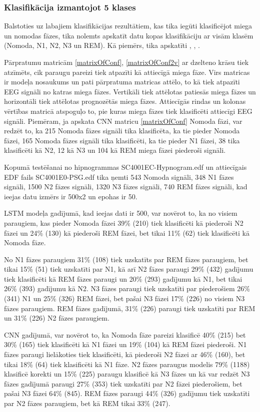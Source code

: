 \documentclass[12pt,paper=A4]{report}
\begin{document}
\subsubsection*{Klasifikācija izmantojot 5 klases}

Balstoties uz labajiem klasifikācijas rezultātiem, kas tika iegūti klasificējot miega un nomodas fāzes, tika nolemts apskatīt datu kopas klasifikāciju ar visām klasēm (Nomoda, N1, N2, N3 un REM). Kā piemērs, tika apskatīti \cite{git1}, \cite{git2}, \cite{git3}. 

Pārpratumu matricām \ref{matrixOfConf}, \ref{matrixOfConf2v} ar dzelteno krāsu tiek atzīmēts, cik paraugu pareizi tiek atpazīti kā attiecīgā miega fāze. Virs matricas ir modeļa nosaukums un pati pārpratuma matricas attēlo, to kā tiek atpazīti EEG signāli 
no katras miega fāzes. Vertikāli tiek attēlotas patiesās miega fāzes un horizontāli tiek attēlotas 
prognozētās miega fāzes. Attiecīgās rindas un kolonas vērtības matricā atspoguļo to, pie kuras miega fāzes tiek klasificēti attiecīgi EEG signāli. Piemēram, ja apskata CNN matricu \ref{matrixOfConf} 
Nomoda fāzi, var redzēt to, ka 215 Nomoda fāzes signāli tika klasificēta, ka tie pieder Nomoda fāzei, 165 Nomoda fāzes signāli tika klasificēti, ka tie pieder N1 fāzei, 38 tika klasificēti kā N2, 12 kā N3 un 104 kā REM miega fāzei piederoši signāli. 

Kopumā testēšanai no hipnogrammas SC4001EC-Hypnogram.edf un attiecīgais EDF fails SC4001E0-PSG.edf tika ņemti 543‬
 Nomoda signāli, ‭348‬ N1 fāzes signāli, 1500 N2 fāzes signāli, 1320 N3 fāzes signāli, 740 REM fāzes signāli, kad ieejas datu izmērs ir 500x2 un epohas ir 50.


LSTM modeļa gadījumā, kad ieejas dati ir 500, var novērot to, ka no visiem paraugiem, kas 
pieder Nomoda fāzei 39\% (210) tiek klasificēti kā piederoši N2 fāzei un 24\% (130) kā piederoši REM fāzei, bet tikai 11\% (62) tiek klasificēti kā Nomoda fāze. ‭

No N1 fāzes paraugiem 31\% (108) tiek uzskatīts par REM fāzes paraugiem, bet tikai 15\% (51) tiek uzskatīti par N1, kā arī N2 fāzes 
paraugi 29\% (432) gadījumu tiek klasificēti kā REM fāzes paraugi un 20\% (293) gadījumu kā N1, bet tikai 26\% (393) gadījumu kā N2. N3 fāzes paraugi tiek uzskatīti par piederošiem 26\% (341) N1 un 25\% (326) REM fāzei, bet pašai N3 fāzei
17\% (226) no visiem N3 fāzes paraugiem. REM fāzes gadījumā, 31\% (226) paraugi tiek uzskatīti par REM un 31\% (226) N2 fāzes paraugiem. 

CNN gadījumā, var novērot to, ka Nomoda fāze pareizi klasificē 40\% (215) bet 30\% (165) tiek klasificēti kā N1 fāzei
un 19\% (104) kā REM fāzei piederoši.
N1 fāzes paraugi lielākoties tiek klasificēti, kā piederoši N2 fāzei ar 46\% (160), bet tikai 18\% (64) tiek klasificēti kā 
N1 fāze. N2 fāzes paraugus modelis 79\% (1188) klasificē korekti un 15\% (225) paraugu klasificē kā N3 fāzes un kā var redzēt N3 fāzes
 gadījumā paraugi 27\% (353) tiek uzskatīti par N2 fāzei piederošiem, bet pašai N3 fāzei 64\% (845). REM fāzes paraugi 44\% (326) gadījumu tiek uzskatīti par N2 fāzes paraugiem, bet kā REM tikai 33\% (247). 
\end{document}

